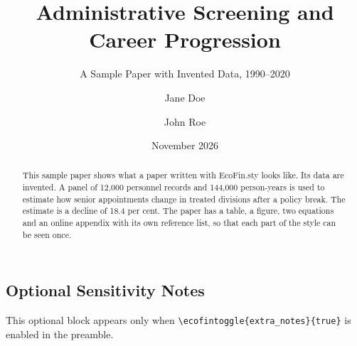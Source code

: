 \documentclass[letterpaper,11pt]{article}
\title[Administrative Screening and Progression]{Administrative Screening and Career Progression}
\subtitle{A Sample Paper with Invented Data, 1990--2020}
\date{November 2026}
\author[1,*]{Jane Doe}
\author[2]{John Roe}
\affil[1]{Example University}[Department of Economics, Example University]
\affil[2]{Partner University}[School of Management, Partner University]
\begin{document}
\maketitle

\begin{abstract}
This sample paper shows what a paper written with EcoFin.sty looks like. Its data are invented. A panel of 12,000 personnel records and 144,000 person-years is used to estimate how senior appointments change in treated divisions after a policy break. The estimate is a decline of 18.4 per cent. The paper has a table, a figure, two equations and an online appendix with its own reference list, so that each part of the style can be seen once.
\end{abstract}

\begin{ecofinmain}


\begin{ecofinblock}[if=extra_notes]
\subsection{Optional Sensitivity Notes}
This optional block appears only when \texttt{\textbackslash ecofintoggle\{extra\_notes\}\{true\}} is enabled in the preamble.
\end{ecofinblock}

\clearpage

\end{ecofinmain}

\begin{ecofinonlineappendix}

\end{ecofinonlineappendix}
\end{document}
